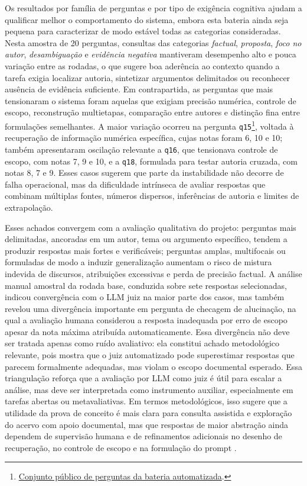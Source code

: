 Os resultados por família de perguntas e por tipo de exigência cognitiva ajudam a qualificar melhor o comportamento do sistema, embora esta bateria ainda seja pequena para caracterizar de modo estável todas as categorias consideradas. Nesta amostra de 20 perguntas, consultas das categorias \textit{factual}, \textit{proposta}, \textit{foco no autor}, \textit{desambiguação} e \textit{evidência negativa} mantiveram desempenho alto e pouca variação entre as rodadas, o que sugere boa aderência ao contexto quando a tarefa exigia localizar autoria, sintetizar argumentos delimitados ou reconhecer ausência de evidência suficiente. Em contrapartida, as perguntas que mais tensionaram o sistema foram aquelas que exigiam precisão numérica, controle de escopo, reconstrução multietapas, comparação entre autores e distinção fina entre formulações semelhantes. A maior variação ocorreu na pergunta \texttt{q15}\footnote{\href{https://github.com/fabriciosantana/mcdia/blob/main/05-iag/4-project/eval/discursos_questions.json}{Conjunto público de perguntas da bateria automatizada}.}, voltada à recuperação de informação numérica específica, cujas notas foram 6, 10 e 10; também apresentaram oscilação relevante a \texttt{q16}, que tensionava controle de escopo, com notas 7, 9 e 10, e a \texttt{q18}, formulada para testar autoria cruzada, com notas 8, 7 e 9. Esses casos sugerem que parte da instabilidade não decorre de falha operacional, mas da dificuldade intrínseca de avaliar respostas que combinam múltiplas fontes, números dispersos, inferências de autoria e limites de extrapolação.

Esses achados convergem com a avaliação qualitativa do projeto: perguntas mais delimitadas, ancoradas em um autor, tema ou argumento específico, tendem a produzir respostas mais fortes e verificáveis; perguntas amplas, multifocais ou formuladas de modo a induzir generalização aumentam o risco de mistura indevida de discursos, atribuições excessivas e perda de precisão factual. A análise manual amostral da rodada base, conduzida sobre sete respostas selecionadas, indicou convergência com o LLM juiz na maior parte dos casos, mas também revelou uma divergência importante em pergunta de checagem de alucinação, na qual a avaliação humana considerou a resposta inadequada por erro de escopo apesar da nota máxima atribuída automaticamente. Essa divergência não deve ser tratada apenas como ruído avaliativo: ela constitui achado metodológico relevante, pois mostra que o juiz automatizado pode superestimar respostas que parecem formalmente adequadas, mas violam o escopo documental esperado. Essa triangulação reforça que a avaliação por LLM como juiz é útil para escalar a análise, mas deve ser interpretada como instrumento auxiliar, especialmente em tarefas abertas ou metavaliativas. Em termos metodológicos, isso sugere que a utilidade da prova de conceito é mais clara para consulta assistida e exploração do acervo com apoio documental, mas que respostas de maior abstração ainda dependem de supervisão humana e de refinamentos adicionais no desenho de recuperação, no controle de escopo e na formulação do prompt \parencite{gao2023ragSurvey,wangEtAl2025segmentation,saadFalconEtAl2024ares}.

